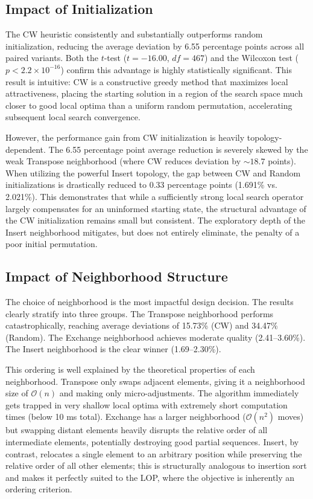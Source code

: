 \documentclass[11pt, a4paper]{article}
\begin{document}
\subsection{Impact of Initialization}

The CW heuristic consistently and substantially outperforms random initialization, reducing the average deviation by 6.55 percentage points across all paired variants. Both the $t$-test ($t = -16.00$, $df = 467$) and the Wilcoxon test ($p < 2.2 \times 10^{-16}$) confirm this advantage is highly statistically significant. This result is intuitive: CW is a constructive greedy method that maximizes local attractiveness, placing the starting solution in a region of the search space much closer to good local optima than a uniform random permutation, accelerating subsequent local search convergence.

However, the performance gain from CW initialization is heavily topology-dependent. The 6.55 percentage point average reduction is severely skewed by the weak Transpose neighborhood (where CW reduces deviation by $\sim 18.7$ points). When utilizing the powerful Insert topology, the gap between CW and Random initializations is drastically reduced to 0.33 percentage points (1.691\% vs. 2.021\%). This demonstrates that while a sufficiently strong local search operator largely compensates for an uninformed starting state, the structural advantage of the CW initialization remains small but consistent. The exploratory depth of the Insert neighborhood mitigates, but does not entirely eliminate, the penalty of a poor initial permutation.

\subsection{Impact of Neighborhood Structure}

The choice of neighborhood is the most impactful design decision. The results clearly stratify into three groups. The Transpose neighborhood performs catastrophically, reaching average deviations of 15.73\% (CW) and 34.47\% (Random). The Exchange neighborhood achieves moderate quality (2.41--3.60\%). The Insert neighborhood is the clear winner (1.69--2.30\%).

This ordering is well explained by the theoretical properties of each neighborhood. Transpose only swaps adjacent elements, giving it a neighborhood size of $\mathcal{O}(n)$ and making only micro-adjustments. The algorithm immediately gets trapped in very shallow local optima with extremely short computation times (below 10 ms total). Exchange has a larger neighborhood ($\mathcal{O}(n^2)$ moves) but swapping distant elements heavily disrupts the relative order of all intermediate elements, potentially destroying good partial sequences. Insert, by contrast, relocates a single element to an arbitrary position while preserving the relative order of all other elements; this is structurally analogous to insertion sort and makes it perfectly suited to the LOP, where the objective is inherently an ordering criterion.
\end{document}
